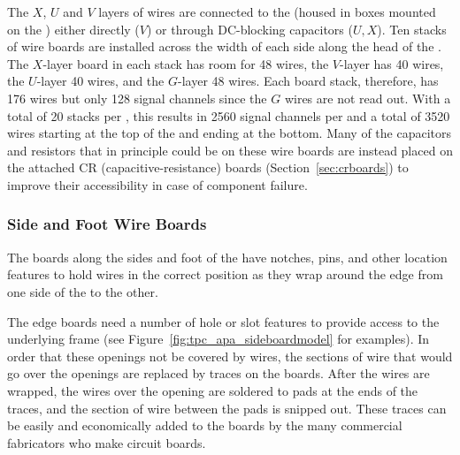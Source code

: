 The $X$, $U$ and $V$ layers of wires are connected to the  (housed in boxes mounted on the ) either directly ($V$) or through DC-blocking capacitors ($U,X$).  Ten stacks of wire boards are installed across the width of each side along the head of the .  The $X$-layer board in each stack has room for \num{48} wires, the $V$-layer has 40 wires, the $U$-layer \num{40} wires, and the $G$-layer \num{48} wires.  Each board stack, therefore, has \num{176} wires but only \num{128} signal channels since the $G$ wires are not read out. With a total of \num{20} stacks per , this results in \num{2560} signal channels per  and a total of \num{3520} wires starting at the top of the  and ending at the bottom. Many of the capacitors and resistors that in principle could be on these wire boards are instead placed on the attached CR (capacitive-resistance) boards (Section~\ref{sec:crboards}) to improve their accessibility in case of component failure. 

\subsubsection{Side and Foot Wire Boards}

The boards along the sides and foot of the  have notches, pins, and other location features to hold wires in the correct position as they wrap around the edge from one side of the  to the other.  

The edge boards need a number of hole or slot features to provide access to the underlying frame (see Figure~\ref{fig:tpc_apa_sideboardmodel} for examples).  In order that these openings not be covered by wires, the sections of wire that would go over the openings are replaced by traces on the boards.  After the wires are wrapped, the wires over the opening are soldered to pads at the ends of the traces, and the section of wire between the pads is snipped out.  These traces can be easily and economically added to the boards by the many commercial fabricators who make circuit boards. 

